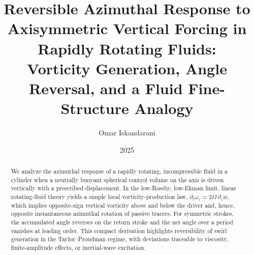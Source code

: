 \documentclass[12pt]{article}
\title{Reversible Azimuthal Response to Axisymmetric Vertical Forcing in Rapidly Rotating Fluids:\\
Vorticity Generation, Angle Reversal, and a Fluid Fine-Structure Analogy}
\author{Omar Iskandarani}
\date{2025}
\newcommand{\p}{\partial}
\begin{document}
    \maketitle


    \begin{abstract}
        We analyze the azimuthal response of a rapidly rotating, incompressible fluid in a cylinder when a neutrally buoyant spherical control volume on the axis is driven vertically with a prescribed displacement. In the low-Rossby, low-Ekman limit, linear rotating-fluid theory yields a simple local vorticity-production law,
        \(
        \p_t \omega_z = 2\Omega\,\p_z w
        \),
        which implies opposite-sign vertical vorticity above and below the driver and, hence, opposite instantaneous azimuthal rotation of passive tracers. For symmetric strokes, the accumulated angle reverses on the return stroke and the net angle over a period vanishes at leading order. This compact derivation highlights reversibility of swirl generation in the Taylor--Proudman regime, with deviations traceable to viscosity, finite-amplitude effects, or inertial-wave excitation.
    \end{abstract}

%
\end{document}
